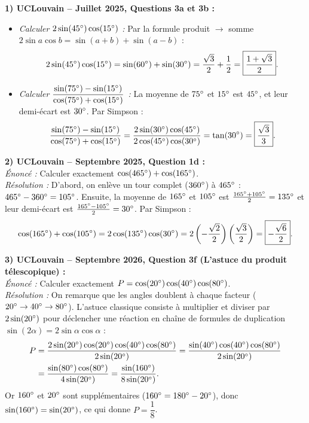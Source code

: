 \begin{exemple}
\textbf{1) UCLouvain -- Juillet 2025, Questions 3a et 3b :}\\
\begin{itemize}
    \item \emph{Calculer $2\sin(45\degree)\cos(15\degree)$ :} Par la formule produit $\to$ somme $2\sin a\cos b = \sin(a+b)+\sin(a-b)$ :
    \[
        2\sin(45\degree)\cos(15\degree) = \sin(60\degree) + \sin(30\degree) = \frac{\sqrt{3}}{2} + \frac{1}{2} = \boxed{\frac{1+\sqrt{3}}{2}}.
    \]
    \item \emph{Calculer $\dfrac{\sin(75\degree) - \sin(15\degree)}{\cos(75\degree) + \cos(15\degree)}$ :} La moyenne de $75\degree$ et $15\degree$ est $45\degree$, et leur demi-écart est $30\degree$. Par Simpson :
    \[
        \frac{\sin(75\degree) - \sin(15\degree)}{\cos(75\degree) + \cos(15\degree)} = \frac{2\sin(30\degree)\cos(45\degree)}{2\cos(45\degree)\cos(30\degree)} = \tan(30\degree) = \boxed{\frac{\sqrt{3}}{3}}.
    \]
\end{itemize}

\medskip
\textbf{2) UCLouvain -- Septembre 2025, Question 1d :}\\
\emph{Énoncé :} Calculer exactement $\cos(465\degree) + \cos(165\degree)$.\\
\emph{Résolution :} D'abord, on enlève un tour complet ($360\degree$) à $465\degree$ : $465\degree - 360\degree = 105\degree$. Ensuite, la moyenne de $165\degree$ et $105\degree$ est $\frac{165\degree+105\degree}{2} = 135\degree$ et leur demi-écart est $\frac{165\degree-105\degree}{2} = 30\degree$. Par Simpson :
\[
    \cos(165\degree) + \cos(105\degree) = 2\cos(135\degree)\cos(30\degree) = 2\left(-\frac{\sqrt{2}}{2}\right)\left(\frac{\sqrt{3}}{2}\right) = \boxed{-\frac{\sqrt{6}}{2}}.
\]

\medskip
\textbf{3) UCLouvain -- Septembre 2026, Question 3f (L'astuce du produit télescopique) :}\\
\emph{Énoncé :} Calculer exactement $P = \cos(20\degree)\cos(40\degree)\cos(80\degree)$.\\
\emph{Résolution :} On remarque que les angles doublent à chaque facteur ($20\degree \to 40\degree \to 80\degree$). L'astuce classique consiste à multiplier et diviser par $2\sin(20\degree)$ pour déclencher une réaction en chaîne de formules de duplication $\sin(2\alpha) = 2\sin\alpha\cos\alpha$ :
\begin{align*}
    P &= \frac{2\sin(20\degree)\cos(20\degree)\cos(40\degree)\cos(80\degree)}{2\sin(20\degree)} = \frac{\sin(40\degree)\cos(40\degree)\cos(80\degree)}{2\sin(20\degree)} \\
    &= \frac{\sin(80\degree)\cos(80\degree)}{4\sin(20\degree)} = \frac{\sin(160\degree)}{8\sin(20\degree)}.
\end{align*}
Or $160\degree$ et $20\degree$ sont supplémentaires ($160\degree = 180\degree - 20\degree$), donc $\sin(160\degree) = \sin(20\degree)$, ce qui donne $P = \boxed{\dfrac{1}{8}}$.
\end{exemple}


